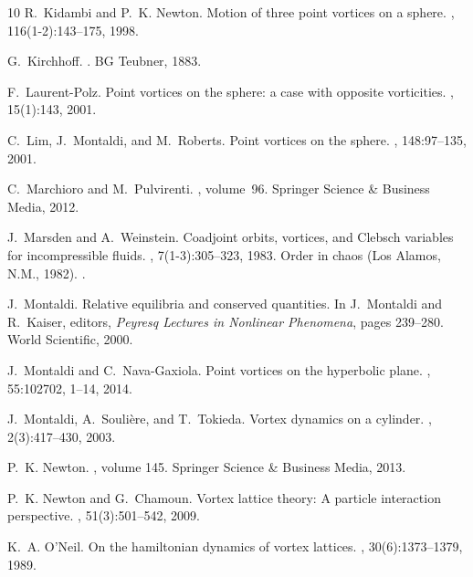 \documentclass[11pt,twoside]{article}
\theoremstyle{definition}
\numberwithin{equation}{section}
\begin{document}
\begin{thebibliography}{10}
R.~Kidambi and P.~K. Newton.
\newblock Motion of three point vortices on a sphere.
, 116(1-2):143--175, 1998.

G.~Kirchhoff.
.
\newblock BG Teubner, 1883.

F.~Laurent-Polz.
\newblock Point vortices on the sphere: a case with opposite vorticities.
, 15(1):143, 2001.

C.~Lim, J.~Montaldi, and M.~Roberts.
\newblock Point vortices on the sphere.
, 148:97--135, 2001.

C.~Marchioro and M.~Pulvirenti.
, volume~96.
\newblock Springer Science \& Business Media, 2012.

J.~Marsden and A.~Weinstein.
\newblock Coadjoint orbits, vortices, and {C}lebsch variables for incompressible fluids.
, 7(1-3):305--323, 1983.
\newblock Order in chaos (Los Alamos, N.M., 1982).
\newblock \href {https://doi.org/10.1016/0167-2789(83)90134-3} {}.

J.~Montaldi.
\newblock Relative equilibria and conserved quantities.
\newblock In J.~Montaldi and R.~Kaiser, editors, {\em Peyresq Lectures in Nonlinear Phenomena}, pages 239--280. World Scientific, 2000.

J.~Montaldi and C.~Nava-Gaxiola.
\newblock Point vortices on the hyperbolic plane.
, 55:102702, 1--14, 2014.

J.~Montaldi, A.~Souli{\`e}re, and T.~Tokieda.
\newblock Vortex dynamics on a cylinder.
, 2(3):417--430, 2003.

P.~K. Newton.
, volume 145.
\newblock Springer Science \& Business Media, 2013.

P.~K. Newton and G.~Chamoun.
\newblock Vortex lattice theory: A particle interaction perspective.
, 51(3):501--542, 2009.

K.~A. O’Neil.
\newblock On the hamiltonian dynamics of vortex lattices.
, 30(6):1373--1379, 1989.


\end{thebibliography}
\end{document}
